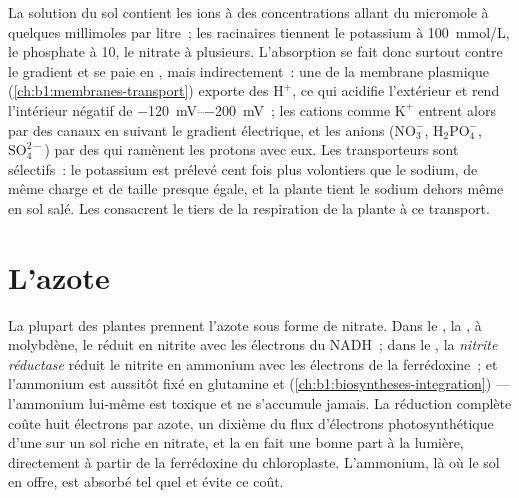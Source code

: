 \begin{proposition}\label{prop:b1:plant-water-minerals:uptake}
La solution du sol contient les ions à des concentrations allant du
micromole à quelques millimoles par litre~; les  racinaires
tiennent le potassium à \qty{100}{mmol/L}, le phosphate à \qty{10}{},
le nitrate à plusieurs. L'absorption se fait donc surtout contre le
gradient et se paie en , mais indirectement~: une \emph{} de la membrane plasmique (\cref{ch:b1:membranes-transport})
exporte des $\mathrm{H^+}$, ce qui acidifie l'extérieur et rend
l'intérieur négatif de \qtyrange{-120}{-200}{mV}~; les cations comme
$\mathrm{K^+}$ entrent alors par des canaux en suivant le gradient
électrique, et les anions
($\mathrm{NO_3^-}$, $\mathrm{H_2PO_4^-}$, $\mathrm{SO_4^{2-}}$) par des
 qui ramènent les protons avec eux. Les transporteurs sont
sélectifs~: le potassium est prélevé cent fois plus volontiers que le
sodium, de même charge et de taille presque égale, et la plante tient
le sodium dehors même en sol salé. Les  consacrent le tiers de
la respiration de la plante à ce transport.
\end{proposition}

\section{L'azote}

\begin{proposition}\label{prop:b1:plant-water-minerals:nitrate}
La plupart des plantes prennent l'azote sous forme de nitrate. Dans le
, la \emph{},  à molybdène, le réduit en
nitrite avec les électrons du NADH~; dans le , la \emph{nitrite
réductase} réduit le nitrite en ammonium avec les électrons de la
ferrédoxine~; et l'ammonium est aussitôt fixé en glutamine et 
(\cref{ch:b1:biosyntheses-integration}) --- l'ammonium lui-même est
toxique et ne s'accumule jamais. La réduction complète coûte huit
électrons par azote, un dixième du flux d'électrons photosynthétique
d'une  sur un sol riche en nitrate, et la  en fait une
bonne part à la lumière, directement à partir de la ferrédoxine du
chloroplaste. L'ammonium, là où le sol en offre, est absorbé tel quel
et évite ce coût.
\end{proposition}

